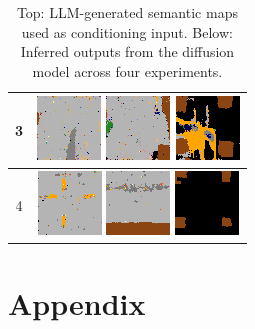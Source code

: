 \documentclass{article}
\begin{document}
\begin{table}
\begin{tabular}{c | c}
3 &
\includegraphics[width=0.15\linewidth]{images/llm_inferred1_exp3.png}
\includegraphics[width=0.15\linewidth]{images/llm_inferred2_exp3.png}
\includegraphics[width=0.15\linewidth]{images/llm_inferred3_exp3.png} \\
\midrule

4 &
\includegraphics[width=0.15\linewidth]{images/llm_inferred1_exp4.png}
\includegraphics[width=0.15\linewidth]{images/llm_inferred2_exp4.png}
\includegraphics[width=0.15\linewidth]{images/llm_inferred3_exp4.png} \\

\bottomrule
\end{tabular}
\caption*{Top: LLM-generated semantic maps used as conditioning input. Below: Inferred outputs from the diffusion model across four experiments.}
\label{tab:llm_results}
\end{table}


\clearpage
\section*{Appendix}
\end{document}
